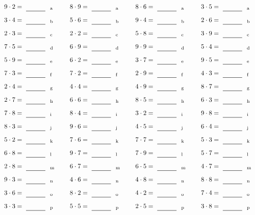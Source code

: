 \documentclass
[
  draft    = true,
  fontsize = 11pt,
  parskip  = half-
]
{scrartcl}
\begin{document}
\par\vfill\par
\begin{align*}
    \pline{9\cdot2}&=\rline{a}
  & \pline{8\cdot9}&=\rline{a}
  & \pline{8\cdot6}&=\rline{a}
  & \pline{3\cdot5}&=\rline{a} \\[1ex]
    \pline{3\cdot4}&=\rline{b}
  & \pline{5\cdot6}&=\rline{b}
  & \pline{9\cdot4}&=\rline{b}
  & \pline{2\cdot6}&=\rline{b} \\[1ex]
    \pline{2\cdot3}&=\rline{c}
  & \pline{2\cdot2}&=\rline{c}
  & \pline{5\cdot8}&=\rline{c}
  & \pline{3\cdot9}&=\rline{c} \\[1ex]
    \pline{7\cdot5}&=\rline{d}
  & \pline{6\cdot9}&=\rline{d}
  & \pline{9\cdot9}&=\rline{d}
  & \pline{5\cdot4}&=\rline{d} \\[1ex]
    \pline{5\cdot9}&=\rline{e}
  & \pline{6\cdot2}&=\rline{e}
  & \pline{3\cdot7}&=\rline{e}
  & \pline{9\cdot5}&=\rline{e} \\[1ex]
    \pline{7\cdot3}&=\rline{f}
  & \pline{7\cdot2}&=\rline{f}
  & \pline{2\cdot9}&=\rline{f}
  & \pline{4\cdot3}&=\rline{f} \\[1ex]
    \pline{2\cdot4}&=\rline{g}
  & \pline{4\cdot4}&=\rline{g}
  & \pline{4\cdot9}&=\rline{g}
  & \pline{8\cdot7}&=\rline{g} \\[1ex]
    \pline{2\cdot7}&=\rline{h}
  & \pline{6\cdot6}&=\rline{h}
  & \pline{8\cdot5}&=\rline{h}
  & \pline{6\cdot3}&=\rline{h} \\[1ex]
    \pline{7\cdot8}&=\rline{i}
  & \pline{8\cdot4}&=\rline{i}
  & \pline{3\cdot2}&=\rline{i}
  & \pline{9\cdot8}&=\rline{i} \\[1ex]
    \pline{8\cdot3}&=\rline{j}
  & \pline{9\cdot6}&=\rline{j}
  & \pline{4\cdot5}&=\rline{j}
  & \pline{6\cdot4}&=\rline{j} \\[1ex]
    \pline{5\cdot2}&=\rline{k}
  & \pline{7\cdot6}&=\rline{k}
  & \pline{7\cdot7}&=\rline{k}
  & \pline{5\cdot3}&=\rline{k} \\[1ex]
    \pline{6\cdot8}&=\rline{l}
  & \pline{9\cdot7}&=\rline{l}
  & \pline{7\cdot9}&=\rline{l}
  & \pline{5\cdot7}&=\rline{l} \\[1ex]
    \pline{2\cdot8}&=\rline{m}
  & \pline{6\cdot7}&=\rline{m}
  & \pline{6\cdot5}&=\rline{m}
  & \pline{4\cdot7}&=\rline{m} \\[1ex]
    \pline{9\cdot3}&=\rline{n}
  & \pline{4\cdot6}&=\rline{n}
  & \pline{4\cdot8}&=\rline{n}
  & \pline{8\cdot8}&=\rline{n} \\[1ex]
    \pline{3\cdot6}&=\rline{o}
  & \pline{8\cdot2}&=\rline{o}
  & \pline{4\cdot2}&=\rline{o}
  & \pline{7\cdot4}&=\rline{o} \\[1ex]
    \pline{3\cdot3}&=\rline{p}
  & \pline{5\cdot5}&=\rline{p}
  & \pline{2\cdot5}&=\rline{p}
  & \pline{3\cdot8}&=\rline{p}
\end{align*}
\end{document}

